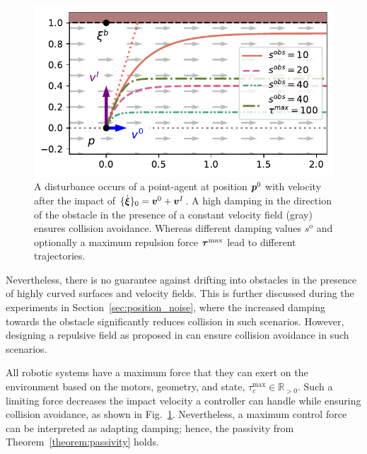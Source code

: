 \begin{figure}[htb]
\centering
  \centerline{\includegraphics[width=0.99\columnwidth]{figures/parallel_avoidance_obstacle}}
  \caption{A disturbance occurs of a point-agent at position $\boldsymbol{p}^0$ with velocity after the impact of $\{ \dot{\boldsymbol{\xi}} \}_0 = \boldsymbol{v}^0 + \boldsymbol{v}^I$. A high damping in the direction of the obstacle in the presence of a constant velocity field (gray) ensures collision avoidance. Whereas different damping values $s^{\mathrm{o}}$ and optionally a maximum repulsion force $\boldsymbol{\tau}^{\mathrm{max}}$ lead to different trajectories.}
  \label{fig:disturbance_with_parallel_velocity}
\end{figure}
    
Nevertheless, there is no guarantee against drifting into obstacles in the presence of highly curved surfaces and velocity fields. \iflong This is further discussed during the experiments in Section~\ref{sec:position_noise}, where the increased damping towards the obstacle significantly reduces collision in such scenarios. \fi However, designing a repulsive field as proposed in \parencite{huber2023avoidance} can ensure collision avoidance in such scenarios.

\iflong
All robotic systems have a maximum force that they can exert on the environment based on the motors, geometry, and state, $\tau_c^{\mathrm{max}} \in \mathbb{R}_{>0}$. Such a limiting force decreases the impact velocity a controller can handle while ensuring collision avoidance, as shown in Fig.~\ref{fig:disturbance_with_parallel_velocity}. Nevertheless, a maximum control force can be interpreted as adapting damping; hence, the passivity from Theorem~\ref{theorem:passivity} holds.
\fi

